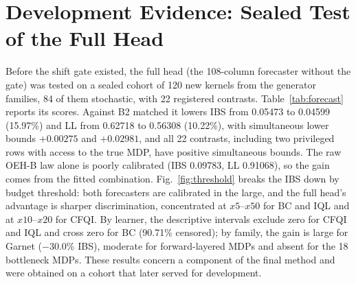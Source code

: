 \section{Development Evidence: Sealed Test of the Full Head}
\label{supp:development}
Before the shift gate existed, the full head (the 108-column forecaster without the gate) was tested on a sealed cohort of 120 new kernels from the generator families, 84 of them stochastic, with 22 registered contrasts. Table~\ref{tab:forecast} reports its scores. Against B2 matched it lowers IBS from 0.05473 to 0.04599 (15.97\%) and LL from 0.62718 to 0.56308 (10.22\%), with simultaneous lower bounds $+0.00275$ and $+0.02981$, and all 22 contrasts, including two privileged rows with access to the true MDP, have positive simultaneous bounds. The raw OEH-B law alone is poorly calibrated (IBS 0.09783, LL 0.91068), so the gain comes from the fitted combination. Fig.~\ref{fig:threshold} breaks the IBS down by budget threshold: both forecasters are calibrated in the large, and the full head's advantage is sharper discrimination, concentrated at $x5$--$x50$ for BC and IQL and at $x10$--$x20$ for CFQI. By learner, the descriptive intervals exclude zero for CFQI and IQL and cross zero for BC (90.71\% censored); by family, the gain is large for Garnet ($-30.0\%$ IBS), moderate for forward-layered MDPs and absent for the 18 bottleneck MDPs. These results concern a component of the final method and were obtained on a cohort that later served for development.

